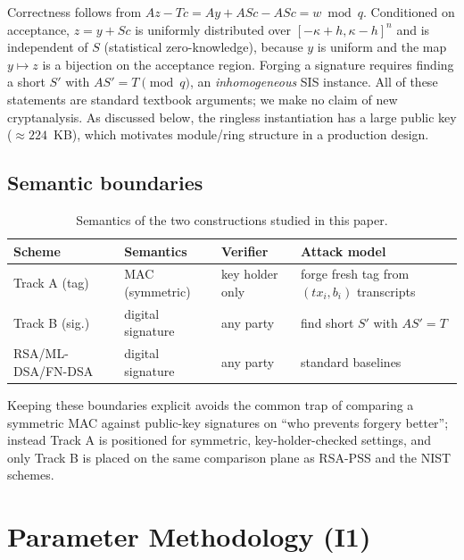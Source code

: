 \documentclass[11pt]{article}
\begin{document}
Correctness follows from $A z - T c = A y + A S c - A S c = w \bmod q$.
Conditioned on acceptance, $z = y + S c$ is uniformly distributed over
$[-\kappa+h, \kappa-h]^n$ and is independent of $S$ (statistical
zero-knowledge), because $y$ is uniform and the map $y \mapsto z$ is a
bijection on the acceptance region.  Forging a signature requires finding a
short $S'$ with $A S' = T \pmod q$, an \emph{inhomogeneous} SIS instance.  All
of these statements are standard textbook arguments; we make no claim of new
cryptanalysis.  As discussed below, the ringless instantiation has a large
public key ($\approx 224$~KB), which motivates module/ring structure in a
production design.

\subsection{Semantic boundaries}
\begin{table}[t]
\centering
\caption{Semantics of the two constructions studied in this paper.}
\label{tab:semantics}
\small
\begin{tabular}{@{}lllp{4.7cm}@{}}
\toprule
Scheme & Semantics & Verifier & Attack model \\
\midrule
Track A (tag)   & MAC (symmetric)  & key holder only & forge fresh tag from $(tx_i,b_i)$ transcripts \\
Track B (sig.)  & digital signature & any party & find short $S'$ with $A S'=T$ \\
RSA/ML-DSA/FN-DSA & digital signature & any party & standard baselines \\
\bottomrule
\end{tabular}
\end{table}
Keeping these boundaries explicit avoids the common trap of comparing a
symmetric MAC against public-key signatures on ``who prevents forgery better'';
instead Track A is positioned for symmetric, key-holder-checked settings, and
only Track B is placed on the same comparison plane as RSA-PSS and the NIST
schemes.

\section{Parameter Methodology (I1)}\label{sec:method}
\end{document}
